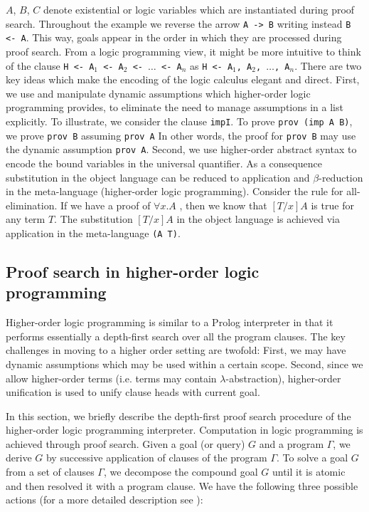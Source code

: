 \documentclass{llncs}
\newcommand{\z}{\mbox{}}
\begin{document}

$A$, $B$, $C$ denote existential or logic variables which are
instantiated during proof search. Throughout the example we reverse
the arrow {\tt{A -> B}} writing instead {\tt{B <- A}}. This way, goals
appear in the order in which they are processed during proof
search. From a logic programming view, it might be more intuitive to
think of the clause {\tt{H <- A$_1$ <- A$_2$ <- $\ldots$ <- A$_n$}} as
{\tt{H <- A$_1$, A$_2$, $\ldots$, A$_n$}}. There are two key ideas
which make the encoding of the logic calculus elegant and direct.
First, we use and manipulate dynamic assumptions which higher-order
logic programming provides, to eliminate the need to manage
assumptions in a list explicitly. To illustrate, we consider the
clause {\tt impI}. To prove {\tt prov (imp A B)}, we prove {\tt prov
B} assuming {\tt prov A} In other words, the proof for {\tt prov B}
may use the dynamic assumption {\tt prov A}.  Second, we use
higher-order abstract syntax to encode the bound variables in the
universal quantifier. As a consequence substitution in the object
language can be reduced to application and $\beta$-reduction in the
meta-language (higher-order logic programming). Consider the rule for
all-elimination. If we have a proof of $\forall x.A$ , then we know
that $[T/x]A$ is true for any term $T$. The substitution $[T/x]A$ in
the object language is achieved via application in the meta-language
{\tt (A T)}.


\subsection{Proof search in higher-order logic programming}

Higher-order logic programming is similar to a Prolog interpreter in
that it performs essentially a depth-first search over all the program
clauses. The key challenges in moving to a higher order setting are
twofold: First, we may have dynamic assumptions which may be
used within a certain scope. Second, since we allow higher-order
terms (i.e. terms may contain $\lambda$-abstraction), higher-order
unification is used to unify clause heads with current goal. 

In this section,  we briefly describe the depth-first proof search
procedure of the higher-order logic programming
interpreter. Computation in logic programming is achieved through
proof search. Given a goal (or query) $G$ and a program $\Gamma$, we
derive $G$ by successive application of clauses of the program
$\Gamma$. 
To solve a goal $G$ from a set of clauses $\Gamma$, we decompose the
compound goal $G$ until it is atomic and then resolved it with a
program clause. We have the following three possible actions (for a
more detailed description see \cite{Miller91apal}):
\end{document}
